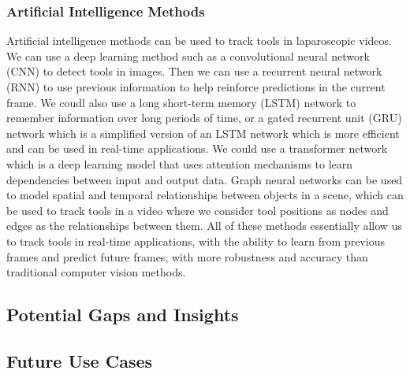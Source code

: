 \subsubsection{Artificial Intelligence Methods}

Artificial intelligence methods can be used to track tools in laparoscopic videos. We can use a deep learning method such as a convolutional neural network (CNN) to detect tools in images. Then we can use a recurrent neural network (RNN) to use previous information to help reinforce predictions in the current frame. We coudl also use a long short-term memory (LSTM) network to remember information over long periods of time, or a gated recurrent unit (GRU) network which is a simplified version of an LSTM network which is more efficient and can be used in real-time applications. We could use a transformer network which is a deep learning model that uses attention mechanisms to learn dependencies between input and output data.  Graph neural networks can be used to model spatial and temporal relationships between objects in a scene, which can be used to track tools in a video where we consider tool positions as nodes and edges as the relationships between them. 
All of these methods essentially allow us to track tools in real-time applications, with the ability to learn from previous frames and predict future frames, with more robustness and accuracy than traditional computer vision methods.

\subsection{Potential Gaps and Insights}



\subsection{Future Use Cases}

